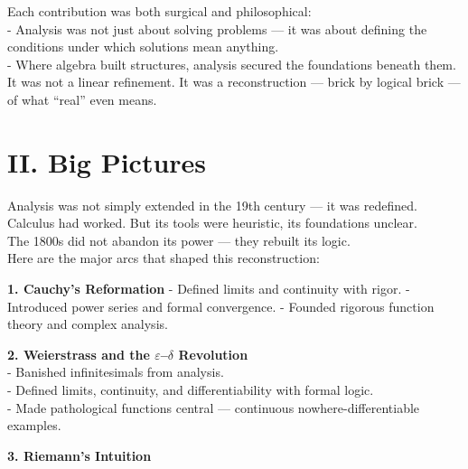 \documentclass[9pt]{article}
\begin{document}
Each contribution was both surgical and philosophical:\\

\noindent
- Analysis was not just about solving problems — it was about defining the conditions under which solutions mean anything.\\

\noindent
- Where algebra built structures, analysis secured the foundations beneath them.\\

It was not a linear refinement.  
It was a reconstruction — brick by logical brick — of what “real” even means.

\newpage

\section*{II. Big Pictures}

\noindent
Analysis was not simply extended in the 19th century — it was redefined.\\

\noindent
Calculus had worked. But its tools were heuristic, its foundations unclear.  \\

\noindent
The 1800s did not abandon its power — they rebuilt its logic.\\

\noindent
Here are the major arcs that shaped this reconstruction:

\bigskip

\textbf{1. Cauchy’s Reformation}  
- Defined limits and continuity with rigor.  
- Introduced power series and formal convergence.  
- Founded rigorous function theory and complex analysis.

\bigskip

\textbf{2. Weierstrass and the $\varepsilon$–$\delta$ Revolution}  \\

- Banished infinitesimals from analysis.  \\

- Defined limits, continuity, and differentiability with formal logic.  \\

- Made pathological functions central — continuous nowhere-differentiable examples.

\bigskip

\textbf{3. Riemann’s Intuition}  \\
\end{document}
